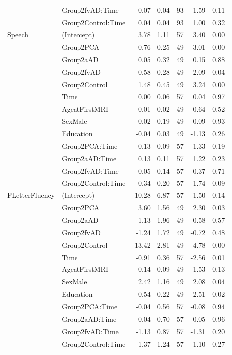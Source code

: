 \documentclass[]{article}
\begin{document}
\begin{table}[ht]
{\begin{tabular}{llrrrrr}
   & Group2fvAD:Time & -0.07 & 0.04 & 93 & -1.59 & 0.11 \\ 
   & Group2Control:Time & 0.04 & 0.04 & 93 & 1.00 & 0.32 \\ 
  Speech & (Intercept) & 3.78 & 1.11 & 57 & 3.40 & 0.00 \\ 
   & Group2PCA & 0.76 & 0.25 & 49 & 3.01 & 0.00 \\ 
   & Group2aAD & 0.05 & 0.32 & 49 & 0.15 & 0.88 \\ 
   & Group2fvAD & 0.58 & 0.28 & 49 & 2.09 & 0.04 \\ 
   & Group2Control & 1.48 & 0.45 & 49 & 3.24 & 0.00 \\ 
   & Time & 0.00 & 0.06 & 57 & 0.04 & 0.97 \\ 
   & AgeatFirstMRI & -0.01 & 0.02 & 49 & -0.64 & 0.52 \\ 
   & SexMale & -0.02 & 0.19 & 49 & -0.09 & 0.93 \\ 
   & Education & -0.04 & 0.03 & 49 & -1.13 & 0.26 \\ 
   & Group2PCA:Time & -0.13 & 0.09 & 57 & -1.33 & 0.19 \\ 
   & Group2aAD:Time & 0.13 & 0.11 & 57 & 1.22 & 0.23 \\ 
   & Group2fvAD:Time & -0.05 & 0.14 & 57 & -0.37 & 0.71 \\ 
   & Group2Control:Time & -0.34 & 0.20 & 57 & -1.74 & 0.09 \\ 
  FLetterFluency & (Intercept) & -10.28 & 6.87 & 57 & -1.50 & 0.14 \\ 
   & Group2PCA & 3.60 & 1.56 & 49 & 2.30 & 0.03 \\ 
   & Group2aAD & 1.13 & 1.96 & 49 & 0.58 & 0.57 \\ 
   & Group2fvAD & -1.24 & 1.72 & 49 & -0.72 & 0.48 \\ 
   & Group2Control & 13.42 & 2.81 & 49 & 4.78 & 0.00 \\ 
   & Time & -0.91 & 0.36 & 57 & -2.56 & 0.01 \\ 
   & AgeatFirstMRI & 0.14 & 0.09 & 49 & 1.53 & 0.13 \\ 
   & SexMale & 2.42 & 1.16 & 49 & 2.08 & 0.04 \\ 
   & Education & 0.54 & 0.22 & 49 & 2.51 & 0.02 \\ 
   & Group2PCA:Time & -0.04 & 0.56 & 57 & -0.08 & 0.94 \\ 
   & Group2aAD:Time & -0.04 & 0.70 & 57 & -0.05 & 0.96 \\ 
   & Group2fvAD:Time & -1.13 & 0.87 & 57 & -1.31 & 0.20 \\ 
   & Group2Control:Time & 1.37 & 1.24 & 57 & 1.10 & 0.27 \\ 

\end{tabular}}
\end{table}
\end{document}
